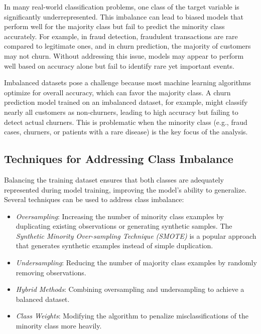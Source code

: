 \documentclass[
]{book}
\providecommand{\tightlist}{%
  \setlength{\itemsep}{0pt}\setlength{\parskip}{0pt}}
\theoremstyle{definition}
\theoremstyle{definition}
\theoremstyle{definition}
\theoremstyle{definition}
\theoremstyle{remark}
\begin{document}
In many real-world classification problems, one class of the target variable is significantly underrepresented. This imbalance can lead to biased models that perform well for the majority class but fail to predict the minority class accurately. For example, in fraud detection, fraudulent transactions are rare compared to legitimate ones, and in churn prediction, the majority of customers may not churn. Without addressing this issue, models may appear to perform well based on accuracy alone but fail to identify rare yet important events.

Imbalanced datasets pose a challenge because most machine learning algorithms optimize for overall accuracy, which can favor the majority class. A churn prediction model trained on an imbalanced dataset, for example, might classify nearly all customers as non-churners, leading to high accuracy but failing to detect actual churners. This is problematic when the minority class (e.g., fraud cases, churners, or patients with a rare disease) is the key focus of the analysis.

\subsection*{Techniques for Addressing Class Imbalance}\label{techniques-for-addressing-class-imbalance}

Balancing the training dataset ensures that both classes are adequately represented during model training, improving the model's ability to generalize. Several techniques can be used to address class imbalance:

\begin{itemize}
\tightlist
\item
  \emph{Oversampling}: Increasing the number of minority class examples by duplicating existing observations or generating synthetic samples. The \emph{Synthetic Minority Over-sampling Technique (SMOTE)} is a popular approach that generates synthetic examples instead of simple duplication.
\item
  \emph{Undersampling}: Reducing the number of majority class examples by randomly removing observations.
\item
  \emph{Hybrid Methods}: Combining oversampling and undersampling to achieve a balanced dataset.
\item
  \emph{Class Weights}: Modifying the algorithm to penalize misclassifications of the minority class more heavily.
\end{itemize}
\end{document}
